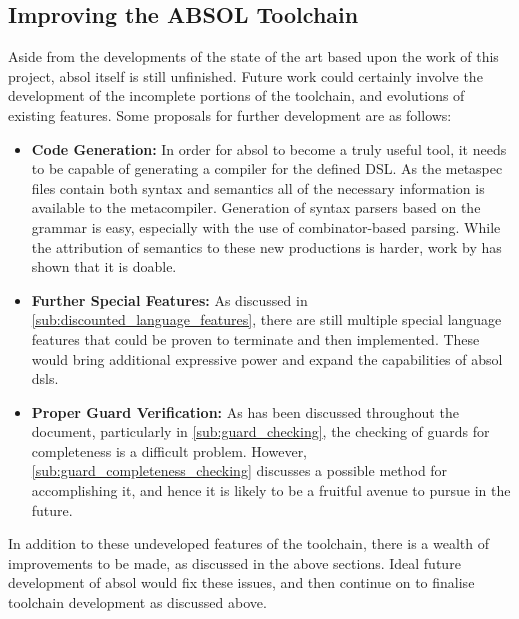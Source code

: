 \subsection{Improving the ABSOL Toolchain} %
\label{sub:improving_the_absol_toolchain}
Aside from the developments of the state of the art based upon the work of this project, \gls{absol} itself is still unfinished.
Future work could certainly involve the development of the incomplete portions of the toolchain, and evolutions of existing features.
Some proposals for further development are as follows:
\begin{itemize}
    \item \textbf{Code Generation:} In order for \gls{absol} to become a truly useful tool, it needs to be capable of generating a compiler for the defined DSL.
    As the \gls{metaspec} files contain both syntax and semantics all of the necessary information is available to the metacompiler.
    Generation of syntax parsers based on the grammar is easy, especially with the use of combinator-based parsing.
    While the attribution of semantics to these new productions is harder, work by \citet{diehl1996semantics} has shown that it is doable.
    \item \textbf{Further Special Features:} As discussed in \autoref{sub:discounted_language_features}, there are still multiple special language features that could be proven to terminate and then implemented.
    These would bring additional expressive power and expand the capabilities of \gls{absol} \glspl{dsl}.
    \item \textbf{Proper Guard Verification:} As has been discussed throughout the document, particularly in \autoref{sub:guard_checking}, the checking of guards for completeness is a difficult problem.
    However, \autoref{sub:guard_completeness_checking} discusses a possible method for accomplishing it, and hence it is likely to be a fruitful avenue to pursue in the future. 
\end{itemize}

In addition to these undeveloped features of the toolchain, there is a wealth of improvements to be made, as discussed in the above sections.
Ideal future development of \gls{absol} would fix these issues, and then continue on to finalise toolchain development as discussed above.



